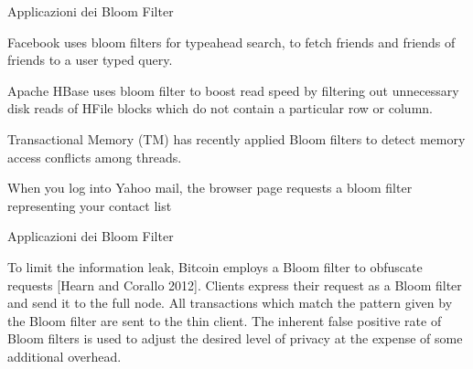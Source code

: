 \begin{frame}{Applicazioni dei Bloom Filter}


\begin{myboxtitle}
\BI
\item \alert{Facebook} uses bloom filters for typeahead search, to fetch friends and friends of friends to a user typed query.
\item \alert{Apache HBase} uses bloom filter to boost read speed by filtering out unnecessary disk reads of HFile blocks which do not contain a particular row or column.
\item \alert{Transactional Memory} (TM) has recently applied Bloom filters to detect memory access conflicts among threads.
\item When you log into \alert{Yahoo} mail, the browser page requests a bloom filter representing your contact list
\EI
\end{myboxtitle}
	
\end{frame}

\begin{frame}{Applicazioni dei Bloom Filter}


\begin{myboxtitle}

To limit the information leak, Bitcoin employs a Bloom filter to obfuscate requests [Hearn and Corallo 2012]. Clients express their request as a Bloom filter and send it to the full node. All transactions which match the pattern given by the Bloom filter are sent to the thin client. The inherent false positive rate of Bloom filters is used to adjust the desired level of privacy at the expense of some additional overhead.
\end{myboxtitle}
	
\end{frame}



